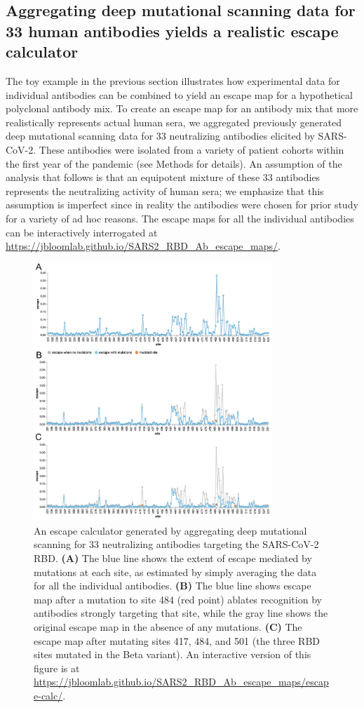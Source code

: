 \documentclass[9pt,twocolumn,twoside]{gsajnl_modified}
\begin{document}
\subsection{Aggregating deep mutational scanning data for 33 human antibodies yields a realistic escape calculator}
The toy example in the previous section illustrates how experimental data for individual antibodies can be combined to yield an escape map for a hypothetical polyclonal antibody mix.
To create an escape map for an antibody mix that more realistically represents actual human sera, we aggregated previously generated deep mutational scanning data for 33 neutralizing antibodies elicited by SARS-CoV-2.
These antibodies were isolated from a variety of patient cohorts within the first year of the pandemic (see Methods for details).
An assumption of the analysis that follows is that an equipotent mixture of these 33 antibodies represents the neutralizing activity of human sera; we emphasize that this assumption is imperfect since in reality the antibodies were chosen for prior study for a variety of ad hoc reasons.
The escape maps for all the individual antibodies can be interactively interrogated at \url{https://jbloomlab.github.io/SARS2_RBD_Ab_escape_maps/}.

\begin{figure}
\includegraphics[width=0.8\textwidth]{figures/escape_calc/escape_calc.pdf}
\caption{
An escape calculator generated by aggregating deep mutational scanning for 33 neutralizing antibodies targeting the SARS-CoV-2 RBD.
{\bf (A)} The blue line shows the extent of escape mediated by mutations at each site, as estimated by simply averaging the data for all the individual antibodies.
{\bf (B)} The blue line shows escape map after a mutation to site 484 (red point) ablates recognition by antibodies strongly targeting that site, while the gray line shows the original escape map in the absence of any mutations.
{\bf (C)} The escape map after mutating sites 417, 484, and 501 (the three RBD sites mutated in the Beta variant).
An interactive version of this figure is at \url{https://jbloomlab.github.io/SARS2_RBD_Ab_escape_maps/escape-calc/}.}
\label{fig:escape_calc}
\end{figure}
\end{document}
